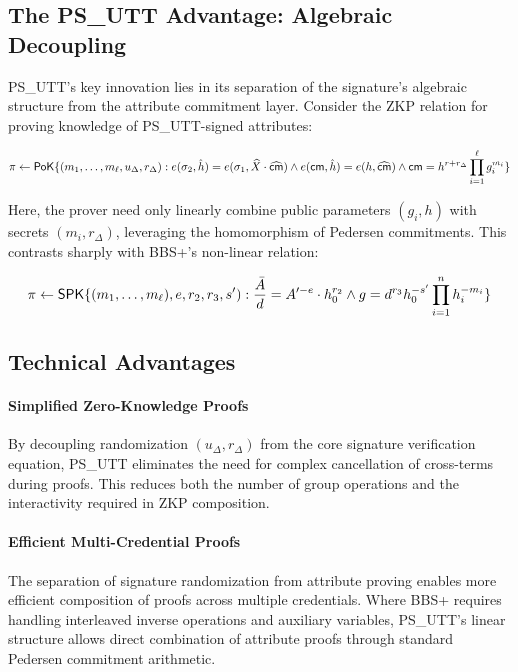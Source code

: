 \subsection{The PS\_UTT Advantage: Algebraic Decoupling}
PS\_UTT's key innovation lies in its separation of the signature's algebraic structure from the attribute commitment layer. Consider the ZKP relation for proving knowledge of PS\_UTT-signed attributes:

\begin{equation}
   \pi \gets \mathsf{PoK}\{(m_1,\ldots,m_\ell, u_\Delta, r_\Delta): 
   e(\sigma_2, \hat{h}) = e(\sigma_1, \widehat{X} \cdot \widehat{\mathsf{cm}}) \wedge
   e(\mathsf{cm}, \hat{h}) = e(h, \widehat{\mathsf{cm}}) \wedge
   \mathsf{cm} = h^{r+r_\Delta} \prod_{i=1}^\ell g_i^{m_i}
   \}
\end{equation}

Here, the prover need only linearly combine public parameters $(g_i, h)$ with secrets $(m_i, r_\Delta)$, leveraging the homomorphism of Pedersen commitments. This contrasts sharply with BBS+'s non-linear relation:

\begin{equation}
   \pi \gets \mathsf{SPK}\{(m_1,\ldots,m_{\ell}), e, r_2, r_3, s'): 
   \frac{\Bar{A}}{d} = A'^{-e} \cdot h_0^{r_2} \wedge 
   g = d^{r_3}h_0^{-s'}\prod_{i=1}^n h_i^{-m_i}\}
\end{equation}

\subsection{Technical Advantages}

\paragraph{Simplified Zero-Knowledge Proofs}
By decoupling randomization $(u_\Delta, r_\Delta)$ from the core signature verification equation, PS\_UTT eliminates the need for complex cancellation of cross-terms during proofs. This reduces both the number of group operations and the interactivity required in ZKP composition. 

\paragraph{Efficient Multi-Credential Proofs}
The separation of signature randomization from attribute proving enables more efficient composition of proofs across multiple credentials. Where BBS+ requires handling interleaved inverse operations and auxiliary variables, PS\_UTT's linear structure allows direct combination of attribute proofs through standard Pedersen commitment arithmetic.

